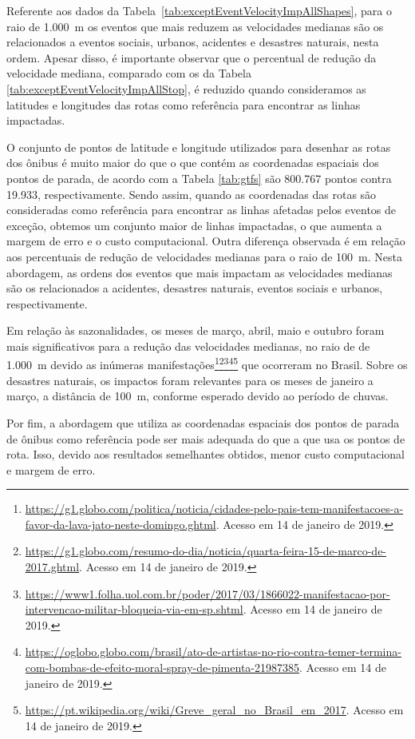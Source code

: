 \documentclass[
	12pt,				%
	oneside,			%
	a4paper,			%
	english,			%
	brazil				%
	]{abntex2ppgsi}
\begin{document}
{{Referente aos dados da Tabela~\ref{tab:exceptEventVelocityImpAllShapes}, para o raio de 1.000~m os eventos que mais reduzem as velocidades medianas são os relacionados a eventos sociais, urbanos, acidentes e desastres naturais, nesta ordem. Apesar disso, é importante observar que o percentual de redução da velocidade mediana, comparado com os da Tabela \ref{tab:exceptEventVelocityImpAllStop}, é reduzido quando consideramos as latitudes e longitudes das rotas como referência para encontrar as linhas impactadas. 

O conjunto de pontos de latitude e longitude utilizados para desenhar as rotas dos ônibus é muito maior do que o que contém as coordenadas espaciais dos pontos de parada, de acordo com a Tabela \ref{tab:gtfs} são 800.767 pontos contra 19.933, respectivamente. Sendo assim, quando as coordenadas das rotas são consideradas como referência para encontrar as linhas afetadas pelos eventos de exceção, obtemos um conjunto maior de linhas impactadas, o que aumenta a margem de erro e o custo computacional. Outra diferença observada é em relação aos percentuais de redução de velocidades medianas para o raio de 100~m. Nesta abordagem, as ordens dos eventos que mais impactam as velocidades medianas são os relacionados a acidentes, desastres naturais, eventos sociais e urbanos, respectivamente.

Em relação às sazonalidades, os meses de  março, abril, maio e outubro foram mais significativos para a redução das velocidades medianas, no raio de de 1.000~m devido as inúmeras manifestações\footnote{\url{https://g1.globo.com/politica/noticia/cidades-pelo-pais-tem-manifestacoes-a-favor-da-lava-jato-neste-domingo.ghtml}. Acesso em 14 de janeiro de 2019.}\footnote{\url{https://g1.globo.com/resumo-do-dia/noticia/quarta-feira-15-de-marco-de-2017.ghtml}. Acesso em 14 de janeiro de 2019.}\footnote{\url{https://www1.folha.uol.com.br/poder/2017/03/1866022-manifestacao-por-intervencao-militar-bloqueia-via-em-sp.shtml}. Acesso em 14 de janeiro de 2019.}\footnote{\url{https://oglobo.globo.com/brasil/ato-de-artistas-no-rio-contra-temer-termina-com-bombas-de-efeito-moral-spray-de-pimenta-21987385}. Acesso em 14 de janeiro de 2019.}\footnote{\url{https://pt.wikipedia.org/wiki/Greve\_geral\_no\_Brasil\_em\_2017}. Acesso em 14 de janeiro de 2019.} que ocorreram no Brasil. Sobre os desastres naturais, os impactos foram relevantes para os meses de janeiro a março, a distância de 100~m, conforme esperado devido ao período de chuvas.

Por fim, a abordagem que utiliza as coordenadas espaciais dos pontos de parada de ônibus como referência pode ser mais adequada do que a que usa os pontos de rota. Isso, devido aos resultados semelhantes obtidos, menor custo computacional e margem de erro.

}}
\end{document}
